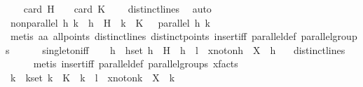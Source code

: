\begin{isabellebody}
\ \ \isamarkupfalse%
\ {\isachardoublequoteopen}card\ {\isacharquery}{\kern0pt}H\ {\isacharequal}{\kern0pt}\ {}\ {\isasymand}\ card\ {\isacharquery}{\kern0pt}K\ {\isacharequal}{\kern0pt}\ {}{\isachardoublequoteclose}\ \isamarkupfalse%
\ distinct{\isacharunderscore}{\kern0pt}lines\ \isamarkupfalse%
\ auto\isanewline
\isanewline
\ \ \isamarkupfalse%
\ non{\isacharunderscore}{\kern0pt}parallel{\isacharcolon}{\kern0pt}\ {\isachardoublequoteopen}{\isasymAnd}h\ k\ {\isachardot}{\kern0pt}\ {\isacharparenleft}{\kern0pt}h\ {\isasymin}\ {\isacharquery}{\kern0pt}H\ {\isasymand}\ k\ {\isasymin}\ {\isacharquery}{\kern0pt}K\ {\isasymLongrightarrow}\ {\isasymnot}\ parallel\ h\ k{\isacharparenright}{\kern0pt}{\isachardoublequoteclose}\ \isanewline
\ \ \isamarkupfalse%
\ {\isacharparenleft}{\kern0pt}metis\ a{}a\ all{\isacharunderscore}{\kern0pt}points\ distinct{\isacharunderscore}{\kern0pt}lines\ distinct{\isacharunderscore}{\kern0pt}points\ insert{\isacharunderscore}{\kern0pt}iff\ parallel{\isacharunderscore}{\kern0pt}def\ parallel{\isacharunderscore}{\kern0pt}groups\isanewline
\ \ \ \ \ \ singleton{\isacharunderscore}{\kern0pt}iff{\isacharparenright}{\kern0pt}\isanewline
\isanewline
\isanewline
\ \ \isamarkupfalse%
\ h\ \ hset{\isacharcolon}{\kern0pt}\ {\isachardoublequoteopen}h\ {\isasymin}\ {\isacharquery}{\kern0pt}H{\isachardoublequoteclose}\ \ {\isachardoublequoteopen}h\ {\isasymnoteq}\ l{\isachardoublequoteclose}\ \ x{\isacharunderscore}{\kern0pt}not{\isacharunderscore}{\kern0pt}on{\isacharunderscore}{\kern0pt}h{\isacharcolon}{\kern0pt}\ {\isachardoublequoteopen}{\isasymnot}\ X\ {\isasymlhd}\ h{\isachardoublequoteclose}\ \ \isamarkupfalse%
\ distinct{\isacharunderscore}{\kern0pt}lines\isanewline
\ \ \ \ \isamarkupfalse%
\ {\isacharparenleft}{\kern0pt}metis\ insert{\isacharunderscore}{\kern0pt}iff\ parallel{\isacharunderscore}{\kern0pt}def\ parallel{\isacharunderscore}{\kern0pt}groups\ xfacts{\isacharparenright}{\kern0pt}\isanewline
\ \ \isamarkupfalse%
\ k\ \ kset{\isacharcolon}{\kern0pt}\ {\isachardoublequoteopen}k\ {\isasymin}\ {\isacharquery}{\kern0pt}K{\isachardoublequoteclose}\ \ {\isachardoublequoteopen}k\ {\isasymnoteq}\ l{\isachardoublequoteclose}\ \ x{\isacharunderscore}{\kern0pt}not{\isacharunderscore}{\kern0pt}on{\isacharunderscore}{\kern0pt}k{\isacharcolon}{\kern0pt}\ {\isachardoublequoteopen}{\isasymnot}\ X\ {\isasymlhd}\ k{\isachardoublequoteclose}\ \ \isamarkupfalse%

\end{isabellebody}
